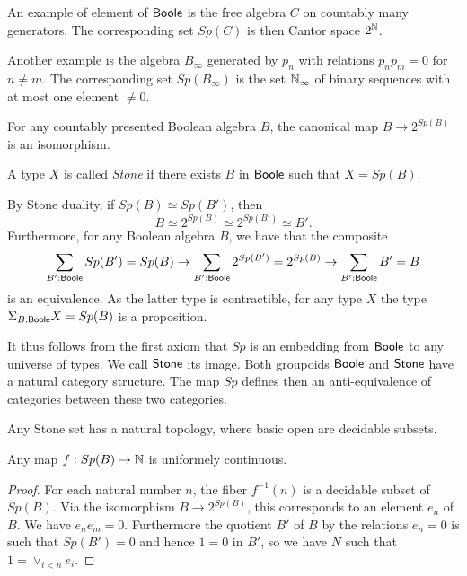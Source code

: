 \medskip

An example of element of $\mathsf{Boole}$ is the free algebra $C$ on countably many generators. The corresponding set $Sp(C)$
is then Cantor space $2^{\mathbb{N}}$.

Another example is the algebra $B_{\infty}$ generated by $p_n$ with relations $p_np_m = 0$ for $n\neq m$. The corresponding
set $Sp(B_{\infty})$ is the set $\mathbb{N}_{\infty}$ of binary sequences with at most one element $\neq 0$.

\begin{axiom}
  For any countably presented Boolean algebra $B$, the canonical map   $B\rightarrow  2^{Sp(B)}$ is an isomorphism.
\end{axiom} 

\begin{definition}
  A type $X$ is called \textit{Stone} if there exists $B$ in $\mathsf{Boole}$ such that $X = Sp(B)$. 
\end{definition}

\begin{remark}
  By Stone duality, if $Sp(B) \simeq  Sp(B')$, then $$B \simeq 2^{Sp(B)} \simeq 2^{Sp(B')} \simeq B'.$$
  Furthermore, for any Boolean algebra $B$, we have that the composite
  $$ 
  \sum\limits_{B' : \mathsf{Boole}} Sp(B') = Sp(B) \to 
  \sum\limits_{B' : \mathsf{Boole}} 2^{Sp(B')} = 2^{Sp(B)} \to
  \sum\limits_{B' : \mathsf{Boole}} B' = B 
  $$ 
  is an equivalence. As the latter type is contractible, for any type $X$ the type $\Sigma_{B:\mathsf{Boole}}X = Sp(B)$ is a proposition.
\end{remark} 

It thus follows from the first axiom that $Sp$ is an embedding from $\mathsf{Boole}$ to any universe of types. We call
$\mathsf{Stone}$ its image. Both groupoids $\mathsf{Boole}$ and $\mathsf{Stone}$ have a natural category structure.
The map $Sp$ defines then an anti-equivalence of categories between these two categories.


Any Stone set has a natural topology, where basic open are decidable subsets.

\medskip

\begin{proposition}
Any map $f: Sp(B)\rightarrow\mathbb{N}$ is uniformely continuous.
\end{proposition}  

\begin{proof}
  For each natural number $n$, the fiber $f^{-1}(n)$ is a decidable
  subset of $Sp(B)$. Via the isomorphism $B\rightarrow 2^{Sp(B)}$, this corresponds to an element $e_n$ of $B$. We have
  $e_ne_m = 0$. Furthermore the quotient $B'$ of $B$ by the relations $e_n = 0$ is such that $Sp(B') = 0$ and hence
  $1 = 0$ in $B'$, so we have $N$ such that $1 = \vee_{i<n}e_i$.
\end{proof}

